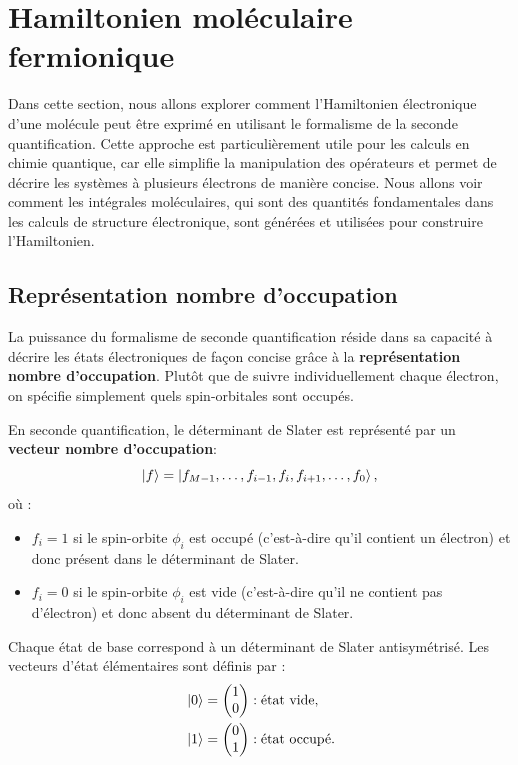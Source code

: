 \documentclass[12pt,a4paper,svgnames,x11names,rgb,table]{article} %
\numberwithin{equation}{section} %
\numberwithin{figure}{section} %
\numberwithin{table}{section} %
\begin{document}
\section{Hamiltonien moléculaire fermionique}

Dans cette section, nous allons explorer comment l'Hamiltonien électronique d'une molécule peut être exprimé en utilisant le formalisme de la seconde quantification. Cette approche est particulièrement utile pour les calculs en chimie quantique, car elle simplifie la manipulation des opérateurs et permet de décrire les systèmes à plusieurs électrons de manière concise. Nous allons voir comment les intégrales moléculaires, qui sont des quantités fondamentales dans les calculs de structure électronique, sont générées et utilisées pour construire l'Hamiltonien.

\subsection{Représentation nombre d'occupation}

La puissance du formalisme de seconde quantification réside dans sa capacité à décrire les états électroniques de façon concise grâce à la \textbf{représentation nombre d'occupation}. Plutôt que de suivre individuellement chaque électron, on spécifie simplement quels spin-orbitales sont occupés.

En seconde quantification, le déterminant de Slater est représenté par un \textbf{vecteur nombre d'occupation}:
\begin{equation}\label{eq:occupation_vector}
\ket{f} = \ket{f_{M-1}, \dots, f_{i-1}, f_i, f_{i+1}, \dots, f_0},
\end{equation}
où :
\begin{itemize}
    \item $f_i = 1$ si le spin-orbite $\phi_i$ est occupé (c'est-à-dire qu'il contient un électron) et donc présent dans le déterminant de Slater.
    \item $f_i = 0$ si le spin-orbite $\phi_i$ est vide (c'est-à-dire qu'il ne contient pas d'électron) et donc absent du déterminant de Slater.
\end{itemize}
Chaque état de base correspond à un déterminant de Slater antisymétrisé. Les vecteurs d'état élémentaires sont définis par :
\begin{align}\label{eq:occupation_states}
& \ket{0} = \begin{pmatrix} 1 \\ 0 \end{pmatrix} : \text{état vide}, \\
& \ket{1} = \begin{pmatrix} 0 \\ 1 \end{pmatrix} : \text{état occupé}.
\end{align}
\end{document}
